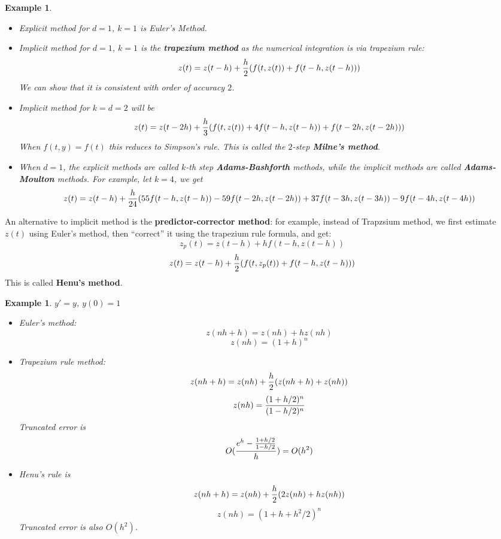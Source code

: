 \documentclass[20pt]{article} %
\theoremstyle{break}
\newtheorem{exa}[definition]{Example}
\begin{document}
\newpage

\begin{exa}\begin{itemize}
  \item Explicit method for $d=1$, $k=1$ is Euler's Method.
  \item Implicit method for $d=1$, $k=1$ is the {\bf trapezium method} as the numerical integration is via trapezium rule:
\[z(t)=z(t-h)+{h\over 2}(f(t, z(t))+f(t-h, z(t-h)))\] 
We can show that it is consistent with order of accuracy $2$.
\item Implicit method for $k=d=2$ will be
  \[z(t)=z(t-2h)+{h\over 3}(f(t, z(t))+4f(t-h, z(t-h))+f(t-2h, z(t-2h)))\]
  When $f(t, y)=f(t)$ this reduces to Simpson's rule. This is called the $2$-step {\bf Milne's method}.
\item When $d=1$, the explicit methods are called $k$-th step {\bf Adams-Bashforth} methods, while the implicit methods are called {\bf Adams-Moulton} methods. For example, let $k=4$, we get
  \[z(t)=z(t-h)+{h\over 24}(55f(t-h, z(t-h))-59f(t-2h, z(t-2h))+37f(t-3h, z(t-3h))-9f(t-4h, z(t-4h))\]
\end{itemize}
\end{exa}


\newpage

An alternative to implicit method is the {\bf predictor-corrector method}: for example, instead of Trapzsium method, we first estimate $z(t)$ using Euler's method, then ``correct'' it using the trapezium rule formula, and get:
\[z_{p}(t)=z(t-h)+hf(t-h, z(t-h))\]
\[z(t)=z(t-h)+{h\over 2}(f(t, z_p(t))+f(t-h, z(t-h)))\] 
This is called {\bf Henu's method}.

\newpage

\begin{exa}
  $y'=y$, $y(0)=1$
  \begin{itemize}
  \item Euler's method:
    \[z(nh+h)=z(nh)+hz(nh)\]
    \[z(nh)=(1+h)^n\]
  \item Trapezium rule method:
    \[z(nh+h)=z(nh)+{h\over 2}(z(nh+h)+z(nh))\]
    \[z(nh)={(1+h/2)^n\over (1-h/2)^n}\]
    Truncated error is
    \[O({e^h-{1+h/2\over 1-h/2}\over h})=O(h^2)\]
  \item Henu's rule is
    \[z(nh+h)=z(nh)+{h\over 2}(2z(nh)+hz(nh))\]
    \[z(nh)=(1+h+h^2/2)^n\]
    Truncated error is also $O(h^2)$.
  \end{itemize}
\end{exa}


\newpage
\end{document}
